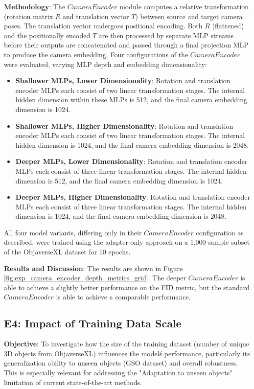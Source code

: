 \textbf{Methodology}:
The $CameraEncoder$ module computes a relative transformation (rotation matrix $R$ and translation vector $T$) between source and target camera poses. The translation vector undergoes positional encoding. Both $R$ (flattened) and the positionally encoded $T$ are then processed by separate MLP streams before their outputs are concatenated and passed through a final projection MLP to produce the camera embedding.
Four configurations of the $CameraEncoder$ were evaluated, varying MLP depth and embedding dimensionality:
\begin{itemize}
  \item \textbf{Shallower MLPs, Lower Dimensionality}: Rotation and translation encoder MLPs each consist of two linear transformation stages. The internal hidden dimension within these MLPs is 512, and the final camera embedding dimension is 1024.
  \item \textbf{Shallower MLPs, Higher Dimensionality}: Rotation and translation encoder MLPs each consist of two linear transformation stages. The internal hidden dimension is 1024, and the final camera embedding dimension is 2048.
  \item \textbf{Deeper MLPs, Lower Dimensionality}: Rotation and translation encoder MLPs each consist of three linear transformation stages. The internal hidden dimension is 512, and the final camera embedding dimension is 1024.
  \item \textbf{Deeper MLPs, Higher Dimensionality}: Rotation and translation encoder MLPs each consist of three linear transformation stages. The internal hidden dimension is 1024, and the final camera embedding dimension is 2048.
\end{itemize}
All four model variants, differing only in their $CameraEncoder$ configuration as described, were trained using the adapter-only approach on a 1,000-sample subset of the ObjaverseXL dataset for 10 epochs.

\textbf{Results and Discussion}:
The results are shown in Figure \ref{fig:exp_camera_encoder_depth_metrics_grid}. The deeper $CameraEncoder$ is able to achieve a slightly better performance on the FID metric, but the standard $CameraEncoder$ is able to achieve a comparable performance.


\subsection{E4: Impact of Training Data Scale}\label{ssec:exp_data_scale}
\textbf{Objective}: To investigate how the size of the training dataset (number of unique 3D objects from ObjaverseXL) influences the model\'s performance, particularly its generalization ability to unseen objects (GSO dataset) and overall robustness. This is especially relevant for addressing the "Adaptation to unseen objects" limitation of current state-of-the-art methods.


